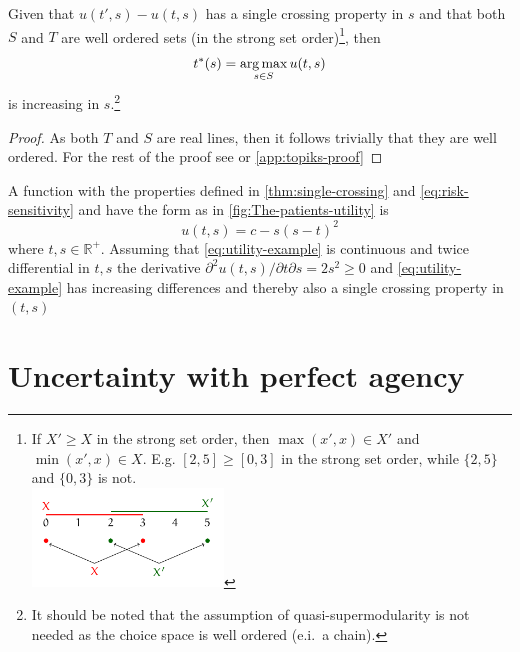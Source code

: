 \documentclass[10pt,a4paper]{article} 					%
\begin{document}
\begin{prop}
Given that \(u(t',s)-u(t,s)\) has a single crossing property in \(s\) and that both \(S\) and \(T\) are well ordered sets (in the strong set order)\footnote{If \(X' \geq X\) in the strong set order, then \(\max (x',x)\in X'\) and \(\min (x',x)\in X\). E.g. \([2,5]\geq[0,3]\) in the strong set order, while \(\{2,5\} \) and \(\{0,3\}\) is not. \\
	\includegraphics[width=0.4\textwidth]{strong-set-order.pdf}
}, then
\[
	t^{*}(s)=\argmax_{s\in S}u(t,s)\label{eq:increasing-solution}
\]
is increasing in \(s\).\footnote{It should be noted that the assumption of quasi-supermodularity is not needed as the choice space is well ordered (e.i.\ a chain).}
\end{prop}

\begin{proof}
As both \(T\) and \(S\) are real lines, then it follows trivially that they are well ordered. For the rest of the proof see \textcite{Milgrom1994} or \cref{app:topiks-proof}
\end{proof}

\begin{example}
A function with the properties defined in \cref{thm:single-crossing} and \cref{eq:risk-sensitivity} and have the form as in \cref{fig:The-patients-utility} is
\[
	u(t,s) = c-s{(s-t)}^{2}\label{eq:utility-example}
\]
where \(t,s\in\mathbb{R}^{+}\). Assuming that \cref{eq:utility-example} is continuous and twice differential in \(t,s\)  the derivative \(\partial^{2}u(t,s)\big/\partial t\partial s=2s^{2}\ge0\) and \cref{eq:utility-example} has increasing differences and thereby also a single crossing property in \((t,s)\)
\end{example}


\section{Uncertainty with perfect agency}
\end{document}
